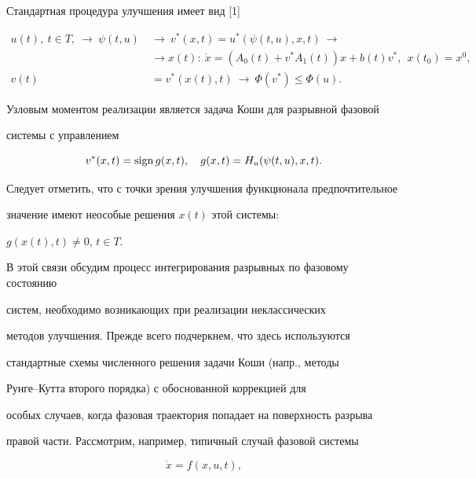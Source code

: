 	


Стандартная процедура улучшения имеет вид [1]


\begin{align*}


u(t),\ t\in T,\ \rightarrow\ \psi(t,u)\ &\rightarrow


\ v^*(x,t)=u^*(\psi(t,u),x,t)\ \rightarrow \\


& \to x(t):\ \Dot{x}=(A_0(t)+v^*A_1(t))x+b(t)v^*,\ \ x(t_0)=x^0,\\


v(t)&=v^*(x(t),t)\ \rightarrow \ \Phi(v^*)\leq \Phi(u).


\end{align*} 


 


Узловым моментом реализации является задача Коши для разрывной фазовой 


системы с управлением


$$


v^*(x,t)=\sign g(x,t),\quad g(x,t)=H_u(\psi(t,u),x,t).


$$ 


	


Следует отметить, что с точки зрения улучшения функционала предпочтительное 


значение имеют неособые решения $x(t)$ этой системы: 


$g(x(t),t)\neq 0$, $t\in T$.





В этой связи обсудим процесс интегрирования разрывных по фазовому состоянию 


систем, необходимо возникающих при реализации неклассических 


методов улучшения. Прежде всего подчеркнем, что здесь используются 


стандартные схемы численного решения задачи Коши (напр., методы 


Рунге--Кутта второго порядка) с обоснованной коррекцией для 


особых случаев, когда фазовая траектория попадает на поверхность разрыва 


правой части. Рассмотрим, например, типичный случай фазовой системы


\begin{equation}


\Dot{x}=f(x,u,t),


\end{equation} 	 	 		 		


